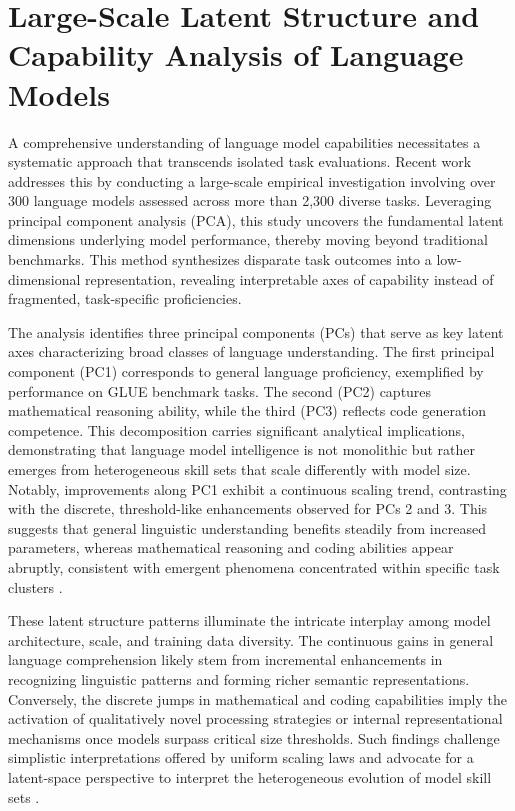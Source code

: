 \documentclass[11pt]{article}
\begin{document}
\section{Large-Scale Latent Structure and Capability Analysis of Language Models}

A comprehensive understanding of language model capabilities necessitates a systematic approach that transcends isolated task evaluations. Recent work \cite{ref45} addresses this by conducting a large-scale empirical investigation involving over 300 language models assessed across more than 2,300 diverse tasks. Leveraging principal component analysis (PCA), this study uncovers the fundamental latent dimensions underlying model performance, thereby moving beyond traditional benchmarks. This method synthesizes disparate task outcomes into a low-dimensional representation, revealing interpretable axes of capability instead of fragmented, task-specific proficiencies.

The analysis identifies three principal components (PCs) that serve as key latent axes characterizing broad classes of language understanding. The first principal component (PC1) corresponds to general language proficiency, exemplified by performance on GLUE benchmark tasks. The second (PC2) captures mathematical reasoning ability, while the third (PC3) reflects code generation competence. This decomposition carries significant analytical implications, demonstrating that language model intelligence is not monolithic but rather emerges from heterogeneous skill sets that scale differently with model size. Notably, improvements along PC1 exhibit a continuous scaling trend, contrasting with the discrete, threshold-like enhancements observed for PCs 2 and 3. This suggests that general linguistic understanding benefits steadily from increased parameters, whereas mathematical reasoning and coding abilities appear abruptly, consistent with emergent phenomena concentrated within specific task clusters \cite{ref45}.

These latent structure patterns illuminate the intricate interplay among model architecture, scale, and training data diversity. The continuous gains in general language comprehension likely stem from incremental enhancements in recognizing linguistic patterns and forming richer semantic representations. Conversely, the discrete jumps in mathematical and coding capabilities imply the activation of qualitatively novel processing strategies or internal representational mechanisms once models surpass critical size thresholds. Such findings challenge simplistic interpretations offered by uniform scaling laws and advocate for a latent-space perspective to interpret the heterogeneous evolution of model skill sets \cite{ref45}.
\end{document}
